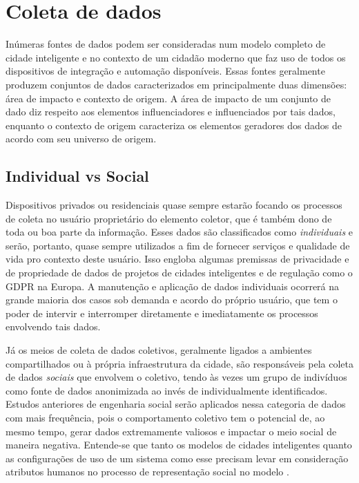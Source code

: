 \chapter{Coleta de dados} \label{c:coleta_de_dados}

Inúmeras fontes de dados podem ser consideradas num modelo completo de cidade inteligente e no contexto de um cidadão moderno que faz uso de todos os dispositivos de integração e automação disponíveis. Essas fontes geralmente produzem conjuntos de dados caracterizados em principalmente duas dimensões: área de impacto e contexto de origem. A área de impacto de um conjunto de dado diz respeito aos elementos influenciadores e influenciados por tais dados, enquanto o contexto de origem caracteriza os elementos geradores dos dados de acordo com seu universo de origem.

\section{Individual vs Social} \label{s:individual_vs_social}

Dispositivos privados ou residenciais quase sempre estarão focando os processos de coleta no usuário proprietário do elemento coletor, que é também dono de toda ou boa parte da informação. Esses dados são classificados como \textit{individuais} e serão, portanto, quase sempre utilizados a fim de fornecer serviços e qualidade de vida pro contexto deste usuário. Isso engloba algumas premissas de privacidade e de propriedade de dados de projetos de cidades inteligentes e de regulação como o GDPR \cite{eu:gdpr} na Europa. A manutenção e aplicação de dados individuais ocorrerá na grande maioria dos casos sob demanda e acordo do próprio usuário, que tem o poder de intervir e interromper diretamente e imediatamente os processos envolvendo tais dados.

Já os meios de coleta de dados coletivos, geralmente ligados a ambientes compartilhados ou à própria infraestrutura da cidade, são responsáveis pela coleta de dados \textit{sociais} que envolvem o coletivo, tendo às vezes um grupo de indivíduos como fonte de dados anonimizada ao invés de individualmente identificados. Estudos anteriores de engenharia social serão aplicados nessa categoria de dados com mais frequência, pois o comportamento coletivo tem o potencial de, ao mesmo tempo, gerar dados extremamente valiosos e impactar o meio social de maneira negativa. Entende-se que tanto os modelos de cidades inteligentes quanto as configurações de uso de um sistema como esse precisam levar em consideração atributos humanos no processo de representação social no modelo \cite{huso17}.

